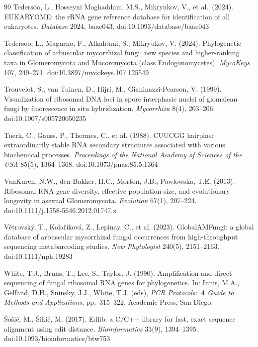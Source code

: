 \documentclass[11pt]{article}
\begin{document}
\begin{thebibliography}{99}
Tedersoo, L., Hosseyni Moghaddam, M.S., Mikryukov, V., et al.\ (2024). EUKARYOME: the rRNA gene reference database
for identification of all eukaryotes. \emph{Database} 2024, baae043. doi:10.1093/database/baae043

Tedersoo, L., Magurno, F., Alkahtani, S., Mikryukov, V. (2024). Phylogenetic classification of arbuscular
mycorrhizal fungi: new species and higher-ranking taxa in Glomeromycota and Mucoromycota (class
Endogonomycetes). \emph{MycoKeys} 107, 249--271. doi:10.3897/mycokeys.107.125549

Trouvelot, S., van Tuinen, D., Hijri, M., Gianinazzi-Pearson, V. (1999). Visualization of
ribosomal DNA loci in spore interphasic nuclei of glomalean fungi by fluorescence in situ
hybridization. \emph{Mycorrhiza} 8(4), 203--206. doi:10.1007/s005720050235

Tuerk, C., Gauss, P., Thermes, C., et al. (1988). CUUCGG hairpins: extraordinarily stable RNA secondary
structures associated with various biochemical processes. \emph{Proceedings of the National Academy of Sciences
of the USA} 85(5), 1364--1368. doi:10.1073/pnas.85.5.1364

VanKuren, N.W., den Bakker, H.C., Morton, J.B., Pawlowska, T.E. (2013). Ribosomal
RNA gene diversity, effective population size, and evolutionary longevity in
asexual Glomeromycota. \emph{Evolution} 67(1), 207--224. doi:10.1111/j.1558-5646.2012.01747.x

V\v{e}trovsk\'y, T., Kola\v{r}\'ikov\'a, Z., Lepinay, C., et al. (2023). GlobalAMFungi: a global database of
arbuscular mycorrhizal fungal occurrences from high-throughput sequencing metabarcoding
studies. \emph{New Phytologist} 240(5), 2151--2163. doi:10.1111/nph.19283

White, T.J., Bruns, T., Lee, S., Taylor, J. (1990). Amplification and direct sequencing of fungal ribosomal RNA
genes for phylogenetics. In: Innis, M.A., Gelfand, D.H., Sninsky, J.J., White, T.J. (eds), \emph{PCR Protocols: A
Guide to Methods and Applications}, pp.\ 315--322. Academic Press, San Diego.

\v{S}o\v{s}i\'c, M., \v{S}iki\'c, M. (2017). Edlib: a C/C++ library for fast, exact
sequence alignment using edit distance. \emph{Bioinformatics} 33(9), 1394--1395.
doi:10.1093/bioinformatics/btw753

\end{thebibliography}
\end{document}
